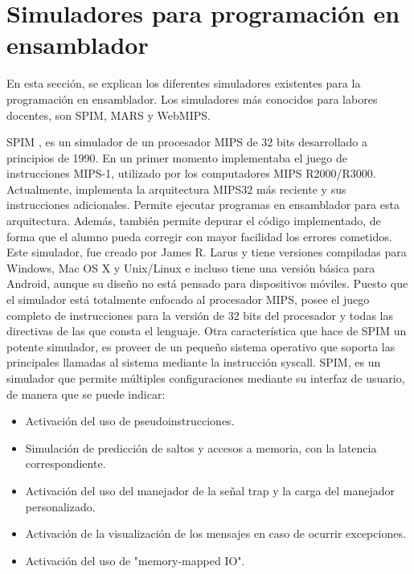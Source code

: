 \section{Simuladores para programación en ensamblador}
\label{sec:simuladores_ensamblador}
En esta sección, se explican los diferentes simuladores existentes para la programación en ensamblador. Los simuladores más conocidos para labores docentes, son SPIM, MARS y WebMIPS.

SPIM \cite{larus1990spim}, es un simulador de un procesador MIPS de 32 bits desarrollado a principios de 1990. En un primer momento implementaba el juego de instrucciones MIPS-1, utilizado por los computadores MIPS R2000/R3000. Actualmente, implementa la arquitectura MIPS32 más reciente y sus instrucciones adicionales. Permite ejecutar programas en ensamblador para esta arquitectura. Además, también permite depurar el código implementado, de forma que el alumno pueda corregir con mayor facilidad los errores cometidos. Este simulador, fue creado por James R. Larus y tiene versiones compiladas para Windows, Mac OS X y Unix/Linux e incluso tiene una versión básica para Android, aunque su diseño no está pensado para dispositivos móviles. Puesto que el simulador está totalmente enfocado al procesador MIPS, posee el juego completo de instrucciones para la versión de 32 bits del procesador y todas las directivas de las que consta el lenguaje. Otra característica que hace de SPIM un potente simulador, es proveer de un pequeño sistema operativo que soporta las principales llamadas al sistema mediante la instrucción syscall. SPIM, es un simulador que permite múltiples configuraciones mediante su interfaz de usuario, de manera que se puede indicar:

\begin{itemize}

\item Activación del uso de pseudoinstrucciones.

\item Simulación de predicción de saltos y accesos a memoria, con la latencia correspondiente.

\item Activación del uso del manejador de la señal trap y la carga del manejador personalizado.

\item Activación de la visualización de los mensajes en caso de ocurrir excepciones.

\item Activación del uso de "memory-mapped IO".

\end{itemize}

